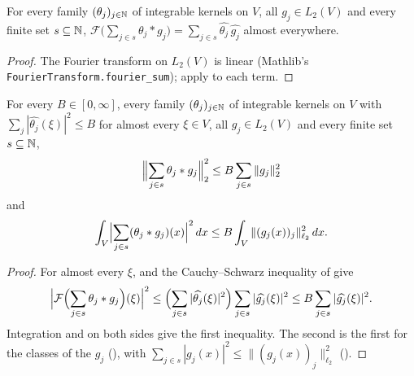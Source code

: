 \begin{lemma}
\label{lem:fourier-sum-conv}
\leanok
{}
For every family $(\theta_j)_{j \in \mathbb{N}}$ of integrable kernels on $V$, all $g_j \in L_2(V)$ and
every finite set $s \subseteq \mathbb{N}$,
$\mathcal F\bigl(\sum_{j \in s} \theta_j * g_j\bigr)
= \sum_{j \in s} \widehat{\theta_j} \, \widehat{g_j}$ almost everywhere.
\end{lemma}

\begin{proof}
\leanok
The Fourier transform on $L_2(V)$ is linear (Mathlib's
\texttt{Fourier\allowbreak Transform.\allowbreak fourier\_\allowbreak sum}); apply
 to each term.
\end{proof}

\begin{theorem}
\label{thm:l2-synthesis-bound}
\leanok
{}
For every $B \in [0, \infty]$, every family $(\theta_j)_{j \in \mathbb{N}}$ of integrable kernels on $V$
with $\sum_j |\widehat{\theta_j}(\xi)|^2 \leq B$ for almost every $\xi \in V$, all
$g_j \in L_2(V)$ and every finite set $s \subseteq \mathbb{N}$,
\[
  \Bigl\|\sum_{j \in s} \theta_j * g_j\Bigr\|_2^2 \leq B \sum_{j \in s} \|g_j\|_2^2
\]
and
\[
  \int_V \Bigl|\sum_{j \in s} (\theta_j * g_j)(x)\Bigr|^2 \, dx
  \leq B \int_V \|(g_j(x))_j\|_{\ell_2}^2 \, dx .
\]
\end{theorem}

\begin{proof}
\leanok
For almost every $\xi$,  and the Cauchy--Schwarz inequality of
 give
\[
  \Bigl|\mathcal F\Bigl(\sum_{j \in s} \theta_j * g_j\Bigr)(\xi)\Bigr|^2
  \leq \Bigl(\sum_{j \in s} |\widehat{\theta_j}(\xi)|^2\Bigr)
  \sum_{j \in s} |\widehat{g_j}(\xi)|^2
  \leq B \sum_{j \in s} |\widehat{g_j}(\xi)|^2 .
\]
Integration and  on both sides give the first inequality. The second is
the first for the classes of the $g_j$ (), with
$\sum_{j \in s} |g_j(x)|^2 \leq \|(g_j(x))_j\|_{\ell_2}^2$ ().
\end{proof}

